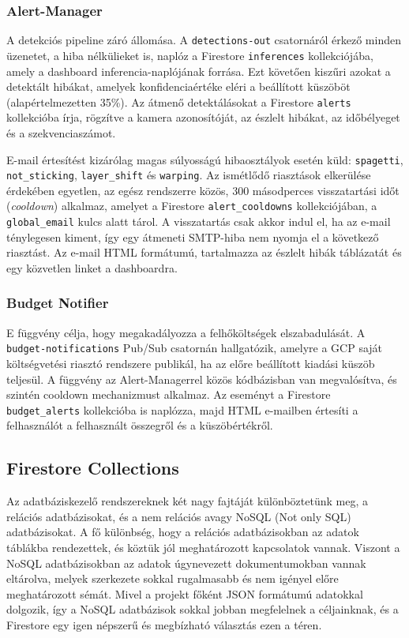             \subsubsection{Alert-Manager}
            A detekciós pipeline záró állomása. A \texttt{detections-out} csatornáról érkező minden üzenetet, a hiba nélkülieket is,
            naplóz a Firestore \texttt{inferences} kollekciójába, amely a dashboard inferencia-naplójának forrása. Ezt követően kiszűri azokat
            a detektált hibákat, amelyek konfidenciaértéke eléri a beállított küszöböt (alapértelmezetten 35\%). Az átmenő detektálásokat a Firestore
            \texttt{alerts} kollekcióba írja, rögzítve a kamera azonosítóját, az észlelt hibákat, az időbélyeget és a szekvenciaszámot.

            E-mail értesítést kizárólag magas súlyosságú hibaosztályok esetén küld: \texttt{spagetti}, \texttt{not\_sticking},
            \texttt{layer\_shift} és \texttt{warping}. Az ismétlődő riasztások elkerülése érdekében egyetlen, az egész rendszerre közös,
            300 másodperces visszatartási időt (\textit{cooldown}) alkalmaz, amelyet a Firestore \texttt{alert\_cooldowns} kollekciójában,
            a \texttt{global\_email} kulcs alatt tárol. A visszatartás csak akkor indul el, ha az e-mail ténylegesen kiment, így egy átmeneti
            SMTP-hiba nem nyomja el a következő riasztást. Az e-mail HTML formátumú, tartalmazza az észlelt hibák táblázatát és egy közvetlen linket a dashboardra.

            \subsubsection{Budget Notifier}
            E függvény célja, hogy megakadályozza a felhőköltségek elszabadulását. A \texttt{budget-notifications} Pub/Sub csatornán
            hallgatózik, amelyre a GCP saját költségvetési riasztó rendszere publikál, ha az előre beállított kiadási küszöb teljesül.
            A függvény az Alert-Managerrel közös kódbázisban van megvalósítva, és szintén cooldown mechanizmust alkalmaz.
            Az eseményt a Firestore \texttt{budget\_alerts} kollekcióba is naplózza, majd HTML e-mailben értesíti a felhasználót
            a felhasznált összegről és a küszöbértékről.

            
        \subsection{Firestore Collections}
        Az adatbáziskezelő rendszereknek két nagy fajtáját különböztetünk meg, a relációs adatbázisokat, és a nem relációs avagy NoSQL (Not only SQL) adatbázisokat.
        A fő különbség, hogy a relációs adatbázisokban az adatok táblákba rendezettek, és köztük jól meghatározott kapcsolatok vannak. Viszont a NoSQL adatbázisokban az
        adatok úgynevezett dokumentumokban vannak eltárolva, melyek szerkezete sokkal rugalmasabb és nem igényel előre meghatározott sémát. Mivel a projekt főként JSON formátumú
        adatokkal dolgozik, így a NoSQL adatbázisok sokkal jobban megfelelnek a céljainknak, és a Firestore egy igen népszerű és megbízható választás ezen a téren\cite{firestore}.

